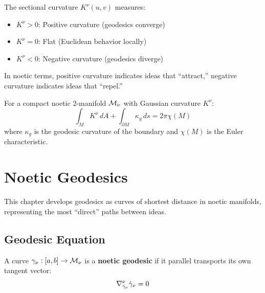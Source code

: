 \begin{proposition}
\label{prop:curvature-interpretation}
The sectional curvature $K^\nu(u, v)$ measures:
\begin{itemize}
    \item $K^\nu > 0$: Positive curvature (geodesics converge)
    \item $K^\nu = 0$: Flat (Euclidean behavior locally)
    \item $K^\nu < 0$: Negative curvature (geodesics diverge)
\end{itemize}
In noetic terms, positive curvature indicates ideas that ``attract,''
negative curvature indicates ideas that ``repel.''
\end{proposition}

\begin{theorem}
\label{thm:gauss-bonnet}
For a compact noetic 2-manifold $\mathcal{M}_\nu$ with Gaussian curvature $K^\nu$:
\[
    \int_M K^\nu \, dA + \int_{\partial M} \kappa_g \, ds = 2\pi \chi(M)
\]
where $\kappa_g$ is the geodesic curvature of the boundary and $\chi(M)$
is the Euler characteristic.
\end{theorem}


\chapter{Noetic Geodesics}
\label{ch:noetic-geodesics}

\begin{tcolorbox}[colback=blue!5!white,colframe=blue!75!black,title=\vnewfour]
This chapter develops geodesics as curves of shortest distance in noetic
manifolds, representing the most ``direct'' paths between ideas.
\end{tcolorbox}

\section{Geodesic Equation}

\begin{definition}
\label{def:noetic-geodesic}
A curve $\gamma_\nu : [a, b] \to \mathcal{M}_\nu$ is a \textbf{noetic geodesic}
if it parallel transports its own tangent vector:
\[
    \nabla^\nu_{\dot{\gamma}_\nu} \dot{\gamma}_\nu = 0
\]
\end{definition}

